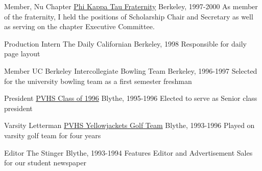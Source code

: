 
\begin{cventries}

	\cventry
		{Member, Nu Chapter}
		{\href{https://www.phikappatau.org}{Phi Kappa Tau Fraternity}}
		{Berkeley, }
		{1997-2000}
		{As member of the fraternity, I held the positions of Scholarship Chair and Secretary as well as serving on the chapter Executive Committee.}

	\cventry
		{Production Intern}
		{The Daily Californian}
		{Berkeley, }
		{1998}
		{Responsible for daily page layout}

	\cventry
		{Member}
		{UC Berkeley Intercollegiate Bowling Team}
		{Berkeley, }
		{1996-1997}
		{Selected for the university bowling team as a first semester freshman}

	\cventry
		{President}
		{\href{http://www.pvusd.us/pvhs/}{PVHS Class of 1996}}
		{Blythe, }
		{1995-1996}
		{Elected to serve as Senior class president}

	\cventry
		{Varsity Letterman}
		{\href{http://www.pvusd.us/pvhs/}{PVHS Yellowjackets Golf Team}}
		{Blythe, }
		{1993-1996}
		{Played on varsity golf team for four years}

	\cventry
		{Editor}
		{The Stinger}
		{Blythe, }
		{1993-1994}
		{Features Editor and Advertisement Sales for our student newspaper}

\end{cventries}
